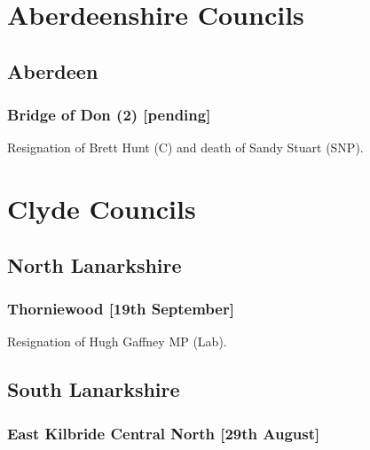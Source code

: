 \documentclass[a4paper,openany]{book}
\begin{document}
\begin{resultsiii}
\section{Aberdeenshire Councils}

\subsection*{Aberdeen}

\subsubsection*{Bridge of Don (2) \hspace*{\fill}\nolinebreak[1]%
	\enspace\hspace*{\fill}
	[pending]}


Resignation of Brett Hunt (C) and death of Sandy Stuart (SNP).

\section{Clyde Councils}

\subsection*{North Lanarkshire}

\subsubsection*{Thorniewood \hspace*{\fill}\nolinebreak[1]%
	\enspace\hspace*{\fill}
	[19th September]}


Resignation of Hugh Gaffney MP (Lab).

\subsection*{South Lanarkshire}

\subsubsection*{East Kilbride Central North \hspace*{\fill}\nolinebreak[1]%
	\enspace\hspace*{\fill}
	[29th August]}


\end{resultsiii}
\end{document}
